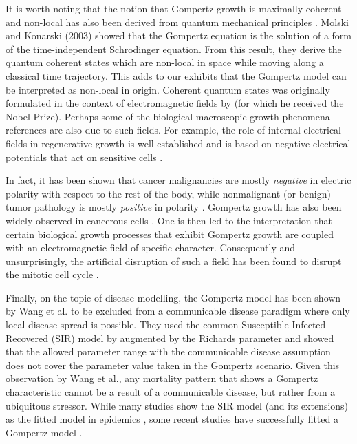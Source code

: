\documentclass{article}
\begin{document}
It is worth noting that the notion that Gompertz growth is maximally coherent and non-local has also been derived from quantum mechanical principles \cite{molski2003coherent}. Molski and Konarski (2003) showed that the Gompertz equation is the solution of a form of the time-independent Schrodinger equation. From this result, they derive the quantum coherent states which are non-local in space while moving along a classical time trajectory. This adds to our exhibits that the Gompertz model can be interpreted as non-local in origin. Coherent quantum states was originally formulated in the context of electromagnetic fields by \citet{glauber1963coherent} (for which he received the Nobel Prize). Perhaps some of the biological macroscopic growth phenomena references are also due to such fields. For example, the role of internal electrical fields in regenerative growth is well established and is based on negative electrical potentials that act on sensitive cells \cite{becker1984electromagnetic}. 

In fact, it has been shown that cancer malignancies are mostly \textit{negative} in electric polarity with respect to the rest of the body, while nonmalignant (or benign) tumor pathology is mostly \textit{positive} in polarity \cite{langman1949technique}. Gompertz growth has also been widely observed in cancerous cells \cite{kozusko2003combining,laird1964dynamics}. One is then led to the interpretation that certain biological growth processes that exhibit Gompertz growth are coupled with an electromagnetic field of specific character. Consequently and unsurprisingly, the artificial disruption of such a field has been found to disrupt the mitotic cell cycle \cite{goodman1983pulsing,liboff1981alternating,norton1984bioelectric,liboff1984time}. 

Finally, on the topic of disease modelling, the Gompertz model has been shown by Wang et al. \cite{wang2012richards} to be excluded from a communicable disease paradigm where only local disease spread is possible. They used the common Susceptible-Infected-Recovered (SIR) model by \citet{kermack1927contribution} augmented by the Richards parameter and showed that the allowed parameter range with the communicable disease assumption does not cover the parameter value taken in the Gompertz scenario. Given this observation by Wang et al., any mortality pattern that shows a Gompertz characteristic cannot be a result of a communicable disease, but rather from a ubiquitous stressor. While many studies show the SIR model (and its extensions) as the fitted model in epidemics \cite{carletti2020covid,cooper2020sir,postnikov2020estimation,munoz2021sir,cooper2022dynamical,saikia2021covid}, some recent studies have successfully fitted a Gompertz model \cite{Ohnishi2020,Rypdal2020,Catala2020,rodrigues2020monte,Levitt2020}.
\end{document}
